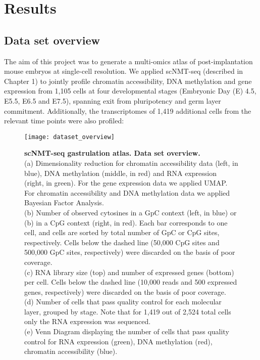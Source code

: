 \graphicspath{{Chapter3/Figs/}}

\section{Results}

\subsection{Data set overview}

The aim of this project was to generate a multi-omics atlas of post-implantation mouse embryos at single-cell resolution. We applied scNMT-seq (described in Chapter 1) to jointly profile chromatin accessibility, DNA methylation and gene expression from 1,105 cells at four developmental stages (Embryonic Day (E) 4.5, E5.5, E6.5 and E7.5), spanning exit from pluripotency and germ layer commitment. Additionally, the transcriptomes of 1,419 additional cells from the relevant time points were also profiled:

\begin{figure}[H]
	\centering
	\texttt{[image: dataset\_overview]}
	\caption[]{\textbf{scNMT-seq gastrulation atlas. Data set overview.}\\
	(a) Dimensionality reduction for chromatin accessibility data (left, in blue), DNA methylation (middle, in red) and RNA expression (right, in green). For the gene expression data we applied UMAP\cite{McInnes2018}. For chromatin accessibility and DNA methylation data we applied Bayesian Factor Analysis\cite{Argelaguet2018}.\\
	(b) Number of observed cytosines in a GpC context (left, in blue) or (b) in a CpG context (right, in red). Each bar corresponds to one cell, and cells are sorted by total number of GpC or CpG sites, respectively. Cells below the dashed line (50,000 CpG sites and 500,000 GpC sites, respectively) were discarded on the basis of poor coverage. \\
	(c) RNA library size (top) and number of expressed genes (bottom) per cell. Cells below the dashed line (10,000 reads and 500 expressed genes, respectively) were discarded on the basis of poor coverage. \\
	(d) Number of cells that pass quality control for each molecular layer, grouped by stage. Note that for 1,419 out of 2,524 total cells only the RNA expression was sequenced.\\
	(e) Venn Diagram displaying the number of cells that pass quality control for RNA expression (green), DNA methylation (red), chromatin accessibility (blue).
	}
	\label{fig:dataset_overview}
\end{figure}



